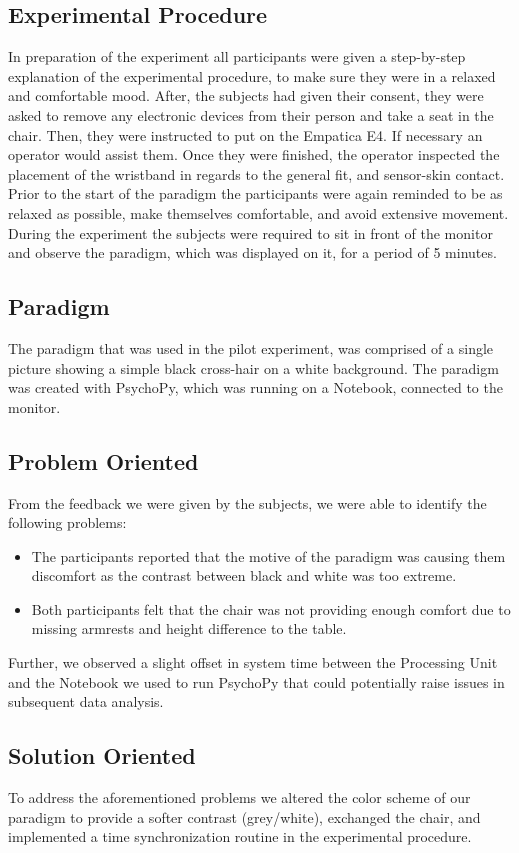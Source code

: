 \subsection{Experimental Procedure}
In preparation of the experiment all participants were given a step-by-step explanation of the experimental procedure, to make sure they were in a relaxed and comfortable mood. After, the subjects had given their consent, they were asked to remove any electronic devices from their person and take a seat in the chair. Then, they were instructed to put on the Empatica E4. If necessary an operator would assist them. Once they were finished, the operator inspected the placement of the wristband in regards to the general fit, and sensor-skin contact. Prior to the start of the paradigm the participants were again reminded to be as relaxed as possible, make themselves comfortable, and avoid extensive movement. During the experiment the subjects were required to sit in front of the monitor and observe the paradigm, which was displayed on it, for a period of 5 minutes. 
\subsection{Paradigm}
The paradigm that was used in the pilot experiment, was comprised of a single picture showing a simple black cross-hair on a white background. The paradigm was created with PsychoPy, which was running on a Notebook, connected to the monitor. 
\subsection{Problem Oriented}
From the feedback we were given by the subjects, we were able to identify the following problems:
\begin{itemize}
\item The participants reported that the motive of the paradigm was causing them discomfort as the contrast between black and white was too extreme.
\item Both participants felt that the chair was not providing enough comfort due to missing armrests and height difference to the table. 
\end{itemize}
Further, we observed a slight offset in system time between the Processing Unit and the Notebook we used to run PsychoPy that could potentially raise issues in subsequent data analysis.

\subsection{Solution Oriented}
To address the aforementioned problems we altered the color scheme of our paradigm to provide a softer contrast (grey/white), exchanged the chair, and implemented a time synchronization routine in the experimental procedure.

